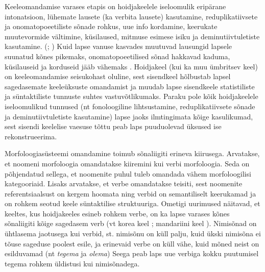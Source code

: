 \documentclass[12pt]{article}
\begin{document}
Keeleomandamise varases etapis on hoidjakeelele iseloomulik eripärane intonatsioon, lühemate lausete (ka verbita lausete) kasutamine, reduplikatiivsete ja onomatopoeetiliste sõnade rohkus, uue info kordamine, keerukate muutevormide vältimine, küsilaused, mitmuse esimese isiku ja deminutiivtuletiste kasutamine. (\citealp[178--182]{Korgesaar}; \citealp[26--29]{Orusalu}) Kuid lapse vanuse kasvades muutuvad lausungid lapsele suunatud kõnes pikemaks, onomatopoeetilised sõnad hakkavad kaduma, küsilauseid ja korduseid jääb vähemaks \citep[37]{Korgesaar2}. Hoidjakeel (kui ka muu ümbritsev keel) on keeleomandamise seisukohast oluline, sest sisendkeel hõlbustab lapsel sagedasemate keeleüksuste omandamist ja muudab lapse sisendkeele statistiliste ja süntaktiliste tunnuste suhtes vastuvõtlikumaks. Paraku pole kõik hoidjakeelele iseloomulikud tunnused (nt fonoloogiline lihtsustamine, reduplikatiivsete sõnade ja deminutiivtuletiste kasutamine) lapse jaoks ilmtingimata kõige kasulikumad, sest sisendi keelelise vaesuse tõttu peab laps puuduolevad üksused ise rekonstrueerima. \citealp{BeyondBabytalk}


Morfoloogiasüsteemi omandamine toimub sõnaliigiti erineva kiirusega. Arvatakse, et noomeni morfoloogia omandatakse kiiremini kui verbi morfoloogia. Seda on põhjendatud sellega, et noomenite puhul tuleb omandada vähem morfoloogilisi kategooriaid. Lisaks arvatakse, et verbe omandatakse teisiti, sest noomenite referentsiaalsust on kergem hoomata ning verbid on semantiliselt keerukamad ja on rohkem seotud keele süntaktilise struktuuriga. \citep{Gentner} Ometigi uurimused näitavad, et keeltes, kus hoidjakeeles esineb rohkem verbe, on ka lapse varases kõnes sõnaliigiti kõige sagedasem verb (vt korea keel \citep{ChoiGopnik}; mandariini keel \citep{Tardif}). Nimisõnad on ühtlasema jaotusega kui verbid, st. nimisõnu on küll palju, kuid ükski nimisõna ei tõuse sageduse poolest esile, ja erinevaid verbe on küll vähe, kuid mõned neist on esilduvamad (nt \emph{tegema} ja \emph{olema}) Seega peab laps uue verbiga kokku puutumisel tegema rohkem üldistusi kui nimisõnadega. \citep[38--39]{Argus_3}
\end{document}
